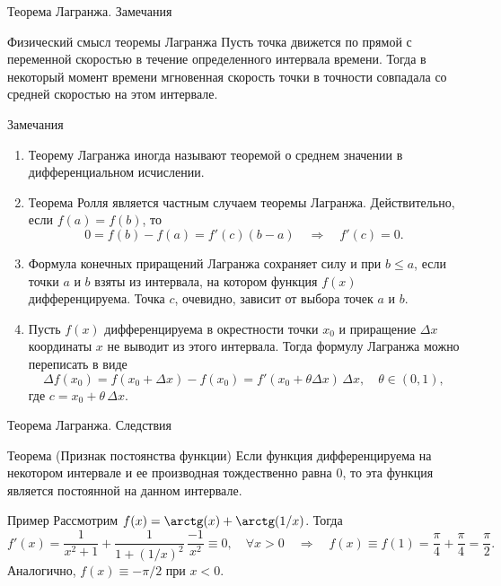 \documentclass[8pt]{beamer}
\begin{document}
\begin{frame}{Теорема Лагранжа. Замечания}
\begin{block}{Физический смысл теоремы Лагранжа}
Пусть точка движется по прямой с переменной скоростью в течение определенного интервала времени. Тогда в некоторый момент времени мгновенная скорость точки в точности совпадала со средней скоростью на этом интервале.
\end{block}
\begin{block}{Замечания}
\begin{enumerate}
\item Теорему Лагранжа иногда называют теоремой о среднем значении в дифференциальном исчислении.
\item Теорема Ролля является частным случаем теоремы Лагранжа. Действительно, если $f(a)=f(b)$, то
$$0=f(b)-f(a) = f'(c)(b-a) \quad \Rightarrow \quad f'(c) = 0.$$
\item Формула конечных приращений Лагранжа сохраняет силу и при $b\le a$, если точки $a$ и $b$ взяты из интервала, на котором функция $f(x)$ дифференцируема. Точка $c$, очевидно, зависит от выбора точек $a$ и $b$.
\item Пусть $f(x)$ дифференцируема в окрестности точки $x_0$ и приращение $\Delta x$ координаты $x$ не выводит из этого интервала. Тогда формулу Лагранжа можно переписать в виде
$$\Delta f(x_0) = f(x_0+\Delta x) - f(x_0) = f'(x_0+\theta \Delta x)\,\Delta x,\quad \theta\in(0,1),$$
где $c=x_0+\theta\, \Delta x$.
\end{enumerate}
\end{block} 
\end{frame}

\begin{frame}{Теорема Лагранжа. Следствия}

\begin{block}{Теорема (Признак постоянства функции)}
Если функция дифференцируема на некотором интервале и ее производная тождественно равна $0$, то эта функция является постоянной на данном интервале.
\end{block}

\begin{block}{Пример}
Рассмотрим $f(x) = \arctg(x)+\arctg(1/x)$. Тогда
$$f'(x) = \frac{1}{x^2+1} + \frac{1}{1+(1/x)^2}\,\frac{-1}{x^2} \equiv 0,\quad \forall x>0 \quad \Rightarrow \quad f(x) \equiv f(1)=\frac{\pi}{4}+\frac{\pi}{4} = \frac{\pi}{2} .$$
Аналогично, $f(x)\equiv -\pi/2$ при $x<0$.
\end{block}

\end{frame}
\end{document}
